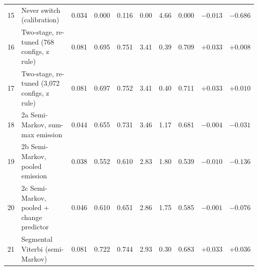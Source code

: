 \begin{table}[t]
\begin{tabular}{@{}rlcccccccc@{}}
15 & Never switch (calibration) & 0.034 & 0.000 & 0.116 & 0.00 & 4.66 & 0.000 & $-0.013$ & $\mathbf{-0.686}$ \\
16 & Two-stage, re-tuned (768 configs, z rule) & 0.081 & 0.695 & 0.751 & 3.41 & 0.39 & 0.709 & $\mathbf{+0.033}$ & $+0.008$ \\
17 & Two-stage, re-tuned (3,072 configs, z rule) & 0.081 & 0.697 & 0.752 & 3.41 & 0.40 & 0.711 & $\mathbf{+0.033}$ & $+0.010$ \\
18 & 2a Semi-Markov, sum-max emission & 0.044 & 0.655 & 0.731 & 3.46 & 1.17 & 0.681 & $-0.004$ & $\mathbf{-0.031}$ \\
19 & 2b Semi-Markov, pooled emission & 0.038 & 0.552 & 0.610 & 2.83 & 1.80 & 0.539 & $-0.010$ & $\mathbf{-0.136}$ \\
20 & 2c Semi-Markov, pooled + change predictor & 0.046 & 0.610 & 0.651 & 2.86 & 1.75 & 0.585 & $-0.001$ & $\mathbf{-0.076}$ \\
21 & Segmental Viterbi (semi-Markov) & 0.081 & 0.722 & 0.744 & 2.93 & 0.30 & 0.683 & $\mathbf{+0.033}$ & $\mathbf{+0.036}$ \\
\bottomrule
\end{tabular}
\end{table}
